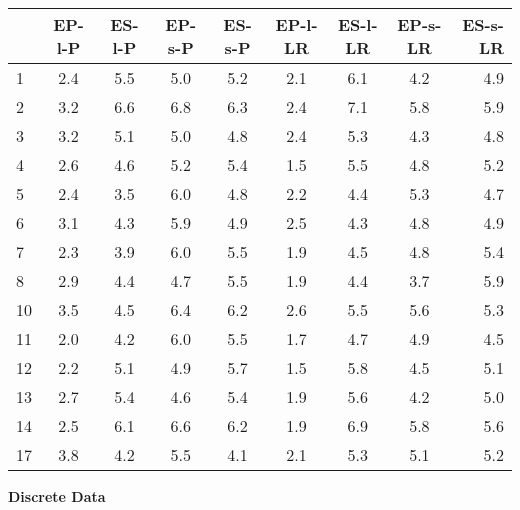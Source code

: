 \documentclass[]{svjour3}
\begin{document}
\begin{table}[H]
\begin{center}
\begin{tabular}{l|c|c|c|c|c|c|c|r}
 & EP-l-P & ES-l-P & EP-s-P & ES-s-P & EP-l-LR & ES-l-LR & EP-s-LR & ES-s-LR \\
\hline
1 & 2.4 & 5.5 & 5.0 & 5.2 & 2.1 & 6.1 & 4.2 & 4.9 \\
2 & 3.2 & 6.6 & 6.8 & 6.3 & 2.4 & 7.1 & 5.8 & 5.9 \\
3 & 3.2 & 5.1 & 5.0 & 4.8 & 2.4 & 5.3 & 4.3 & 4.8 \\
4 & 2.6 & 4.6 & 5.2 & 5.4 & 1.5 & 5.5 & 4.8 & 5.2 \\
5 & 2.4 & 3.5 & 6.0 & 4.8 & 2.2 & 4.4 & 5.3 & 4.7 \\
6 & 3.1 & 4.3 & 5.9 & 4.9 & 2.5 & 4.3 & 4.8 & 4.9 \\
7 & 2.3 & 3.9 & 6.0 & 5.5 & 1.9 & 4.5 & 4.8 & 5.4 \\
8 & 2.9 & 4.4 & 4.7 & 5.5 & 1.9 & 4.4 & 3.7 & 5.9 \\
10 & 3.5 & 4.5 & 6.4 & 6.2 & 2.6 & 5.5 & 5.6 & 5.3 \\
11 & 2.0 & 4.2 & 6.0 & 5.5 & 1.7 & 4.7 & 4.9 & 4.5 \\
12 & 2.2 & 5.1 & 4.9 & 5.7 & 1.5 & 5.8 & 4.5 & 5.1 \\
13 & 2.7 & 5.4 & 4.6 & 5.4 & 1.9 & 5.6 & 4.2 & 5.0 \\
14 & 2.5 & 6.1 & 6.6 & 6.2 & 1.9 & 6.9 & 5.8 & 5.6 \\
17 & 3.8 & 4.2 & 5.5 & 4.1 & 2.1 & 5.3 & 5.1 & 5.2 \\
\end{tabular}
\end{center}
\end{table}



\textbf{Discrete Data}
\end{document}
